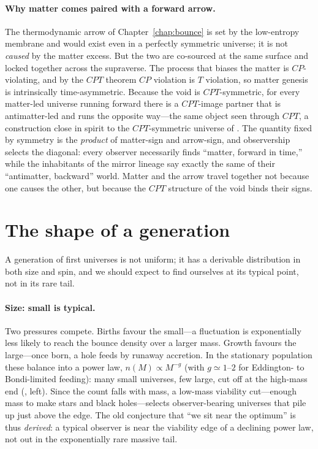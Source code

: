 \paragraph{Why matter comes paired with a forward arrow.} The thermodynamic arrow
of Chapter~\ref{chap:bounce} is set by the low-entropy membrane and would exist
even in a perfectly symmetric universe; it is not \emph{caused} by the matter
excess. But the two are co-sourced at the same surface and locked together across
the supraverse. The process that biases the matter is $CP$-violating, and by the
$CPT$ theorem $CP$ violation is $T$ violation, so matter genesis is intrinsically
time-asymmetric. Because the void is $CPT$-symmetric, for every matter-led
universe running forward there is a $CPT$-image partner that is antimatter-led and
runs the opposite way---the same object seen through $CPT$, a construction close
in spirit to the $CPT$-symmetric universe of \citet{boyle2018}. The quantity fixed by
symmetry is the \emph{product} of matter-sign and arrow-sign, and observership
selects the diagonal: every observer necessarily finds ``matter, forward in
time,'' while the inhabitants of the mirror lineage say exactly the same of their
``antimatter, backward'' world. Matter and the arrow travel together not because
one causes the other, but because the $CPT$ structure of the void binds their
signs.

\section{The shape of a generation}
\label{sec:shape}

A generation of first universes is not uniform; it has a derivable distribution in
both size and spin, and we should expect to find ourselves at its typical point,
not in its rare tail.

\paragraph{Size: small is typical.} Two pressures compete. Births favour the
small---a fluctuation is exponentially less likely to reach the bounce density
over a larger mass. Growth favours the large---once born, a hole feeds by runaway
accretion. In the stationary population these balance into a power law,
$n(M)\propto M^{-g}$ (with $g\simeq1$--$2$ for Eddington- to Bondi-limited
feeding): many small universes, few large, cut off at the high-mass end
(, left). Since the count falls with mass, a low-mass viability
cut---enough mass to make stars and black holes---selects observer-bearing
universes that pile up just above the edge. The old conjecture that ``we sit near
the optimum'' is thus \emph{derived}: a typical observer is near the viability edge
of a declining power law, not out in the exponentially rare massive tail.

